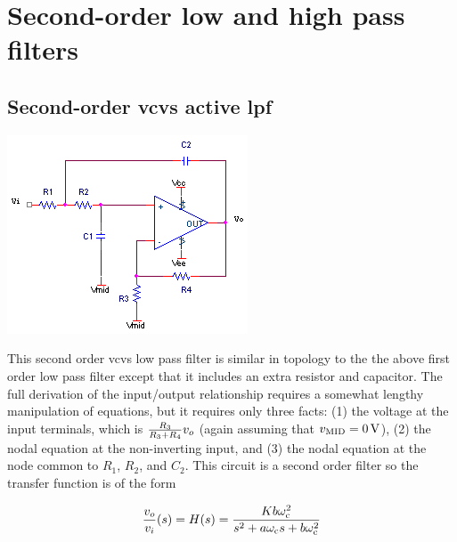 
\section{Second-order low and high pass filters}
\subsection{Second-order \acs{vcvs} active \acl{lpf}}
\begin{center}
	\includegraphics{schematics/2ndorder_vcvs_LPfilter.PNG}
\end{center}
This second order \ac{vcvs} low pass filter is similar in topology to the the above first order low pass filter except that it includes an extra resistor and capacitor.
The full derivation of the input/output relationship requires a somewhat lengthy manipulation of equations, but it requires only three facts: (1) the voltage at the input terminals, which is $\frac{R_3}{R_3 + R_4}\vout$ (again assuming that $v\sub{MID} = \SI{0}{\V}$), (2) the nodal equation at the non-inverting input, and (3) the nodal equation at the node common to $R_1$, $R_2$, and $C_2$.
This circuit is a second order filter so the transfer function is of the form

\textcolor{red}{
\begin{equation}
\frac{\vout}{\vin}(s) = \Hs = \frac{K b \wcutoff^2}{s^{2} + a\wcutoff s + b\wcutoff^2}
\label{eq:2ndorder_vcvs_LPfilter}
\end{equation}
}

